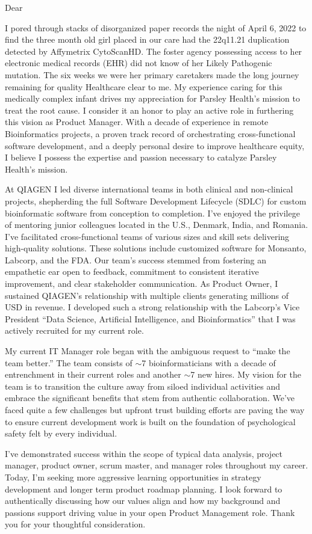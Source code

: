 \documentclass[10pt,letterpaper]{article}
\newcommand{\nameto}[1]{\renewcommand{\nameto}{#1}}
\begin{document}
Dear  \nameto,
\begin{flushleft}
	I pored through stacks of disorganized paper records the night of April 6, 2022 to find the three month old girl placed in our care had the 22q11.21 duplication detected by Affymetrix CytoScanHD. The foster agency possessing access to her electronic medical records (EHR) did not know of her Likely Pathogenic mutation. The six weeks we were her primary caretakers made the long journey remaining for quality Healthcare clear to me. My experience caring for this medically complex infant drives my appreciation for Parsley Health's mission to treat the root cause. I consider it an honor to play an active role in furthering this vision as Product Manager. With a decade of experience in remote Bioinformatics projects, a proven track record of orchestrating cross-functional software development, and a deeply personal desire to improve healthcare equity, I believe I possess the expertise and passion necessary to catalyze Parsley Health's mission.
	
	At QIAGEN I led diverse international teams in both clinical and non-clinical projects, shepherding the full Software Development Lifecycle (SDLC) for custom bioinformatic software from conception to completion. I\rq{}ve enjoyed the privilege of mentoring junior colleagues located in the U.S., Denmark, India, and Romania. I\rq{}ve facilitated cross-functional teams of various sizes and skill sets delivering high-quality solutions. These solutions include customized software for Monsanto, Labcorp, and the FDA. Our team\rq{}s success stemmed from fostering an empathetic ear open to feedback, commitment to consistent iterative improvement, and clear stakeholder communication. As Product Owner, I sustained QIAGEN's relationship with multiple clients generating millions of USD in revenue. I developed such a strong relationship with the Labcorp\rq{}s Vice President  “Data Science, Artificial Intelligence, and Bioinformatics” that I was actively recruited for my current role. 
	 
	My current IT Manager role began with the ambiguous request to “make the team better.” The team consists of \(\sim \)7 bioinformaticians with a decade of entrenchment in their current roles and another \(\sim \)7 new hires. My vision for the team is to transition the culture away from siloed individual activities and embrace the significant benefits that stem from authentic collaboration. We\rq{}ve faced quite a few challenges but upfront trust building efforts are paving the way to ensure current development work is built on the foundation of psychological safety felt by every individual.  
	
	I\rq{}ve demonstrated success within the scope of typical data analysis, project manager, product owner, scrum master, and manager roles throughout my career. Today, I\rq{}m seeking more aggressive learning opportunities in strategy development and longer term product roadmap planning. I look forward to authentically discussing how our values align and how my background and passions support driving value in your open Product Management role. Thank you for your thoughtful consideration.
	

\end{flushleft}
\end{document}

